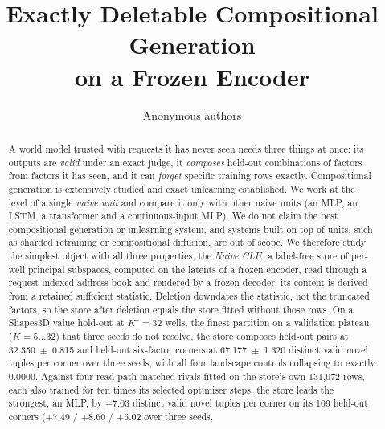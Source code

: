 \documentclass{article} %
\title{Exactly Deletable Compositional Generation\\ on a Frozen Encoder}
\author{Anonymous authors}
\newcommand{\Kstar}{\ensuremath{K^{\star}}}
\begin{document}
\maketitle

\begin{abstract}
A world model trusted with requests it has never seen needs three things at once: its outputs are \emph{valid} under an exact judge, it \emph{composes}
held-out combinations of factors from factors it has seen, and it can \emph{forget} specific
training rows exactly. Compositional generation is extensively studied and exact unlearning established. We work at the level of a single \emph{naive unit} and
compare it only with other naive units (an MLP, an LSTM, a transformer and a continuous-input MLP).
We do not claim the best compositional-generation or unlearning system, and systems built on top of
units, such as sharded retraining or compositional diffusion, are out of scope.
We therefore study the simplest object with all three properties, the \emph{Naive CLU}: a
label-free store of per-well principal subspaces, computed on the latents of a frozen
encoder, read through a request-indexed address book and rendered by a frozen decoder; its
content is derived from a retained sufficient statistic. Deletion downdates the statistic, not the truncated factors, so the store after deletion equals the store fitted without those rows.
On a Shapes3D value hold-out at $\Kstar=32$ wells, the finest partition on a validation plateau
($K=5\ldots32$) that three seeds do not resolve, %
the store composes held-out pairs at 32.350~$\pm$~0.815 and held-out six-factor corners at
67.177~$\pm$~1.320 distinct valid novel tuples per corner over three seeds, with all four landscape
controls collapsing to exactly 0.0000. %
Against four read-path-matched rivals fitted on the store's own 131,072 rows, each also trained for
ten times its selected optimiser steps, the store leads the strongest, an MLP, by +7.03 distinct
valid novel tuples per corner on its 109 held-out corners (+7.49 / +8.60 / +5.02 over three seeds,

\end{abstract}
\end{document}
